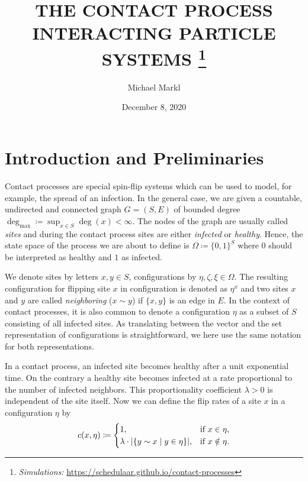\documentclass[a4paper,11pt]{amsart}
\title{THE CONTACT PROCESS\\
{\footnotesize INTERACTING PARTICLE SYSTEMS}
\footnote{\emph{Simulations:} \href{https://schedulaar.github.io/contact-processes}{https://schedulaar.github.io/contact-processes}}}
\author{Michael Markl}
\date{December 8, 2020}
\theoremstyle{theorem}
\theoremstyle{definition}
\DeclarePairedDelimiter\abs{\lvert}{\rvert}%
\begin{document}
\thispagestyle{empty}
\maketitle

\section{Introduction and Preliminaries}

Contact processes are special spin-flip systems which can be used to model, for example, the spread of an infection.
In the general case, we are given a countable, undirected and connected graph $G=(S,E)$ of bounded degree $\deg_{\max}\coloneqq \sup_{x\in S} \deg(x) < \infty$.
The nodes of the graph are usually called \emph{sites} and during the contact process sites are either \emph{infected} or \emph{healthy}.
Hence, the state space of the process we are about to define is $\Omega\coloneqq \{0, 1\}^S$ where $0$ should be interpreted as healthy and $1$ as infected.

We denote sites by letters $x,y \in S$, configurations by $\eta, \zeta, \xi\in\Omega$.
The resulting configuration for flipping site $x$ in configuration is denoted as $\eta^x$ and two sites $x$ and $y$ are called \emph{neighboring} ($x \sim y$) if $\{x,y\}$ is an edge in $E$.
In the context of contact processes, it is also common to denote a configuration $\eta$ as a subset of $S$ consisting of all infected sites.
As translating between the vector and the set representation of configurations is straightforward, we here use the same notation for both representations.

In a contact process, an infected site becomes healthy after a unit exponential time.
On the contrary a healthy site becomes infected at a rate proportional to the number of infected neighbors.
This proportionality coefficient $\lambda > 0$ is independent of the site itself.
Now we can define the flip rates of a site $x$ in a configuration $\eta$ by $$c(x,\eta) \coloneqq \begin{cases}
	1, & \text{if $x\in\eta$,} \\
	\lambda \cdot \abs{ \{ y\sim x \mid y\in\eta \} }, & \text{if $x\notin\eta$.}
\end{cases}$$
\end{document}
